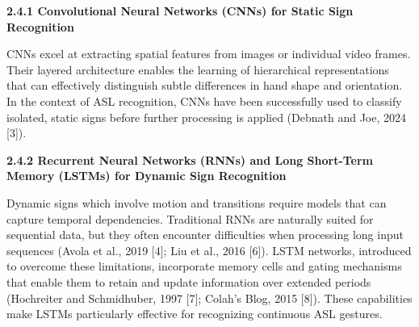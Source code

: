 \documentclass[12pt]{article}
\begin{document}
\vspace{1em}
\noindent
\textbf{2.4.1 Convolutional Neural Networks (CNNs) for Static Sign Recognition}
\vspace{1em}

CNNs excel at extracting spatial features from images or individual video frames. 
Their layered architecture enables the learning of hierarchical representations that can 
effectively distinguish subtle differences in hand shape and orientation. In the context of ASL 
recognition, CNNs have been successfully used to classify isolated, static signs before further 
processing is applied (Debnath and Joe, 2024 [3]).


\vspace{1em}
\noindent
\textbf{2.4.2 Recurrent Neural Networks (RNNs) and Long Short-Term Memory (LSTMs) for Dynamic Sign Recognition}
\vspace{1em}

Dynamic signs which involve motion and transitions require models that can capture 
temporal dependencies. Traditional RNNs are naturally suited for sequential data, but 
they often encounter difficulties when processing long input sequences 
(Avola et al., 2019 [4]; Liu et al., 2016 [6]). LSTM networks, introduced to overcome these 
limitations, incorporate memory cells and gating mechanisms that enable them to retain 
and update information over extended periods (Hochreiter and Schmidhuber, 1997 [7]; Colah’s 
Blog, 2015 [8]). These capabilities make LSTMs particularly effective for recognizing 
continuous ASL gestures.

\end{document}
